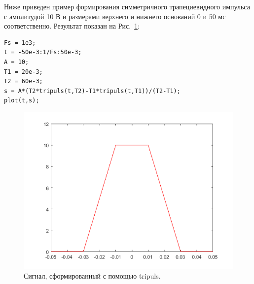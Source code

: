 \documentclass[12pt,a4paper]{article}
\begin{document}
Ниже приведен пример формирования симметричного трапециевидного импульса с амплитудой 10 В и размерами верхнего и нижнего оснований 0 и 50 мс соответственно. Результат показан на Рис.~\ref{fig:img_tripuls}:
\begin{verbatim}
Fs = 1e3;
t = -50e-3:1/Fs:50e-3;
A = 10;
T1 = 20e-3;
T2 = 60e-3;
s = A*(T2*tripuls(t,T2)-T1*tripuls(t,T1))/(T2-T1);
plot(t,s);
\end{verbatim}
\begin{figure}[!ht]
  \centering
  \includegraphics[width=\linewidth]{img_tripuls}
  \caption{Сигнал, сформированный с помощью tripuls.}
  \label{fig:img_tripuls}
\end{figure}
\end{document}
